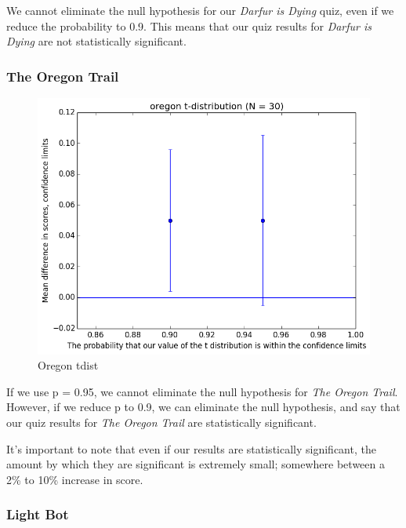 				We cannot eliminate the null hypothesis for our \textit{Darfur is Dying} quiz, even if we reduce the probability to 0.9. This means that our quiz results for \textit{Darfur is Dying} are not statistically significant.

			\subsubsection{The Oregon Trail}

				\begin{figure}[] 
					\centering 
					\includegraphics[width=\textwidth, height=.4\textheight, keepaspectratio=true]{oregon_tdist.png} 
					\caption{Oregon tdist}
				\end{figure}

				If we use p = 0.95, we cannot eliminate the null hypothesis for \textit{The Oregon Trail}. However, if we reduce p to 0.9, we can eliminate the null hypothesis, and say that our quiz results for \textit{The Oregon Trail} are statistically significant.

				It's important to note that even if our results are statistically significant, the amount by which they are significant is extremely small; somewhere between a 2\% to 10\% increase in score.

			\subsubsection{Light Bot}


